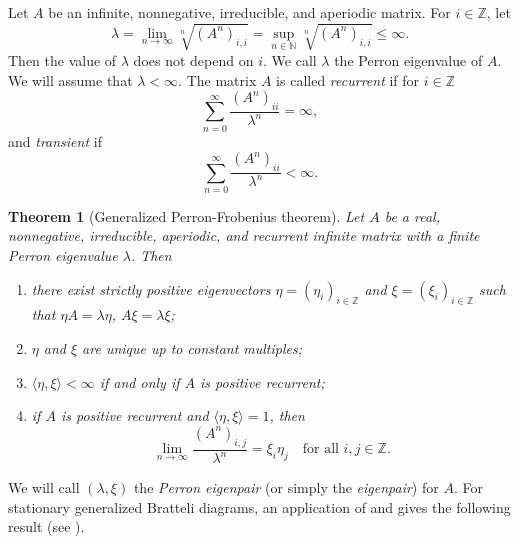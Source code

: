 \documentclass[11pt,reqno]{amsart}
\theoremstyle{definition}
\theoremstyle{remark}
\theoremstyle{plain}
\newtheorem{thm}[definition]{Theorem}
\newcommand{\Z}{\mathbb Z}
\numberwithin{equation}{section}
\begin{document}
Let $A$ be an infinite, nonnegative, irreducible, and aperiodic matrix. For $i \in \Z$, let 
\[
\lambda = \lim\limits_{n \rightarrow \infty} \sqrt[n]{(A^n)_{i,i}} = \sup\limits_{n\in \mathbb{N}} \sqrt[n]{(A^n)_{i,i}} \leq \infty.
\] 
Then the value of $\lambda$ does not depend on $i$. We call $\lambda$ the Perron eigenvalue of $A$. We will assume that $\lambda < \infty$. The matrix $A$ is called \textit{recurrent} if for $i \in \Z$
$$
\sum\limits_{n = 0}^{\infty} \frac{(A^n)_{ii}}{\lambda^n} = \infty, 
$$
and \textit{transient} if
$$
\sum\limits_{n = 0}^{\infty} \frac{(A^n)_{ii}}{\lambda^n} < \infty. 
$$


\begin{thm}[Generalized Perron-Frobenius theorem] 
\label{thm Perron-Frobenius Thm}
Let $A$ be a real, nonnegative, irreducible, aperiodic, and recurrent infinite matrix with a finite Perron eigenvalue $\lambda$. Then 
\begin{enumerate}
\item  there exist strictly positive eigenvectors $\eta = (\eta_i)_{i\in \Z}$ and $\xi = (\xi_i)_{i \in \Z}$ such that $\eta A = \lambda \eta$, $A \xi = \lambda \xi$;

\item $\eta$ and $\xi$ are unique up to constant multiples;

\item $\langle\eta, \xi\rangle < \infty$ if and only if $A$ is 
positive recurrent;

\item if $A$ is positive recurrent and $\langle \eta, \xi\rangle = 1$, then
\[
\lim_{n\to\infty} \frac{(A^n)_{i,j}}{\lambda^n} = \xi_i \eta_j
\quad \text{for all } i,j \in \Z.
\]
\end{enumerate}
\end{thm} We will call $(\lambda, \xi)$ the \textit{Perron eigenpair} (or simply the \textit{eigenpair}) for $A$. For stationary generalized Bratteli diagrams, an application of  and  gives the following result (see
\cite{BezuglyiJorgensen2022, BezuglyiJorgensenKarpelSanadhya2025}).
\end{document}
